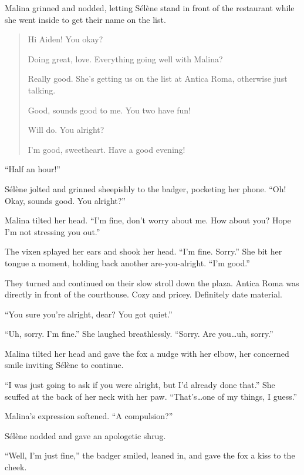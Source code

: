 Malina grinned and nodded, letting Sélène stand in front of the restaurant while she went inside to get their name on the list.

\begin{quote}
 Hi Aiden! You okay?

 Doing great, love. Everything going well with Malina?

 Really good. She's getting us on the list at Antica Roma, otherwise just talking.

 Good, sounds good to me. You two have fun!

 Will do. You alright?

 I'm good, sweetheart. Have a good evening!
\end{quote}

``Half an hour!''

Sélène jolted and grinned sheepishly to the badger, pocketing her phone. ``Oh! Okay, sounds good. You alright?''

Malina tilted her head. ``I'm fine, don't worry about me. How about you? Hope I'm not stressing you out.''

The vixen splayed her ears and shook her head. ``I'm fine. Sorry.'' She bit her tongue a moment, holding back another are-you-alright. ``I'm good.''

They turned and continued on their slow stroll down the plaza. Antica Roma was directly in front of the courthouse. Cozy and pricey. Definitely date material.

``You sure you're alright, dear? You got quiet.''

``Uh, sorry. I'm fine.'' She laughed breathlessly. ``Sorry. Are you\ldots{}uh, sorry.''

Malina tilted her head and gave the fox a nudge with her elbow, her concerned smile inviting Sélène to continue.

``I was just going to ask if you were alright, but I'd already done that.'' She scuffed at the back of her neck with her paw. ``That's\ldots{}one of my things, I guess.''

Malina's expression softened. ``A compulsion?''

Sélène nodded and gave an apologetic shrug.

``Well, I'm just fine,'' the badger smiled, leaned in, and gave the fox a kiss to the cheek.

